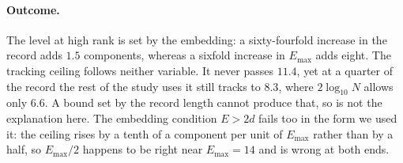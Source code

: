 \documentclass[twoside]{article}
\begin{document}
\begin{table}[H]
\centering
\caption{The ceiling follows neither the embedding condition nor the finite-record bound. Two
sweeps, three seeds per cell. \emph{Tracking} is the largest $r$ at which the median
estimate stays within one component of the truth; \emph{level} is the median estimate at $r = 20$;
\emph{slope} is $\mathrm{d}\hat d_{MG}/\mathrm{d}r$ over $r \ge 8$, which is $1$ if the estimator
still tracks the rank and $0$ if it has stopped.}
\label{tab:ceiling}
\end{table}

\paragraph{Outcome.} The level at high rank is set by the embedding: a sixty-fourfold increase in
the record adds $1.5$ components, whereas a sixfold increase in $E_{\max}$ adds eight. The tracking
ceiling follows neither variable. It never passes $11.4$, yet at a quarter of the record the rest
of the study uses it still tracks to $8.3$, where $2\log_{10}N$ allows only $6.6$. A bound set by the
record length cannot produce that, so \citet{eckmann1992fundamental} is not the explanation here.
The embedding condition $E > 2d$ fails too in the form we used it: the ceiling rises by a tenth
of a component per unit of $E_{\max}$ rather than by a half, so $E_{\max}/2$ happens to be right
near $E_{\max} = 14$ and is wrong at both ends.
\end{document}
